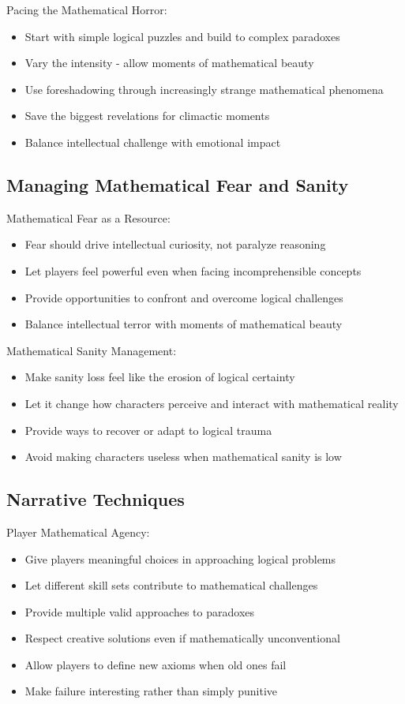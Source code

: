 \documentclass[11pt]{article}
\begin{document}
Pacing the Mathematical Horror:
\begin{itemize}
\item Start with simple logical puzzles and build to complex paradoxes
\item Vary the intensity - allow moments of mathematical beauty
\item Use foreshadowing through increasingly strange mathematical phenomena
\item Save the biggest revelations for climactic moments
\item Balance intellectual challenge with emotional impact
\end{itemize}

\subsection{Managing Mathematical Fear and Sanity}

Mathematical Fear as a Resource:
\begin{itemize}
\item Fear should drive intellectual curiosity, not paralyze reasoning
\item Let players feel powerful even when facing incomprehensible concepts
\item Provide opportunities to confront and overcome logical challenges
\item Balance intellectual terror with moments of mathematical beauty
\end{itemize}

Mathematical Sanity Management:
\begin{itemize}
\item Make sanity loss feel like the erosion of logical certainty
\item Let it change how characters perceive and interact with mathematical reality
\item Provide ways to recover or adapt to logical trauma
\item Avoid making characters useless when mathematical sanity is low
\end{itemize}

\subsection{Narrative Techniques}

Player Mathematical Agency:
\begin{itemize}
\item Give players meaningful choices in approaching logical problems
\item Let different skill sets contribute to mathematical challenges
\item Provide multiple valid approaches to paradoxes
\item Respect creative solutions even if mathematically unconventional
\item Allow players to define new axioms when old ones fail
\item Make failure interesting rather than simply punitive
\end{itemize}
\end{document}
